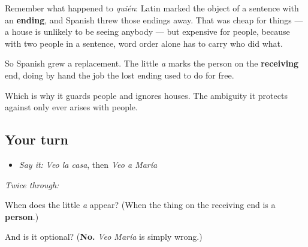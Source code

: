 \begin{culture}
Remember what happened to \emph{quién}: Latin marked the object of a sentence with an \textbf{ending}, and Spanish threw those endings away. That was cheap for things — a house is unlikely to be seeing anybody — but expensive for people, because with two people in a sentence, word order alone has to carry who did what.

So Spanish grew a replacement. The little \emph{a} marks the person on the \textbf{receiving} end, doing by hand the job the lost ending used to do for free.

Which is why it guards people and ignores houses. The ambiguity it protects against only ever arises with people.
\end{culture}

\subsection*{Your turn}
\begin{itemize}
\raggedright
  \item \emph{Say it:} \emph{Veo la casa}, then \emph{Veo a María}
\end{itemize}

\emph{Twice through:}

\begin{tcolorbox}[breakable,colback=teal!4,colframe=teal!35!black,title={Before you move on}]
When does the little \emph{a} appear? (When the thing on the receiving end is a \textbf{person}.)

And is it optional? (\textbf{No.} \emph{Veo María} is simply wrong.)
\end{tcolorbox}
